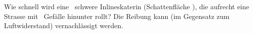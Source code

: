 Wie schnell wird eine \mInO\ schwere Inlineskaterin (Schattenfläche \AInO), die aufrecht eine Strasse mit \pInO\ Gefälle hinunter rollt? Die Reibung kann (im Gegensatz zum Luftwiderstand) vernachlässigt werden.

